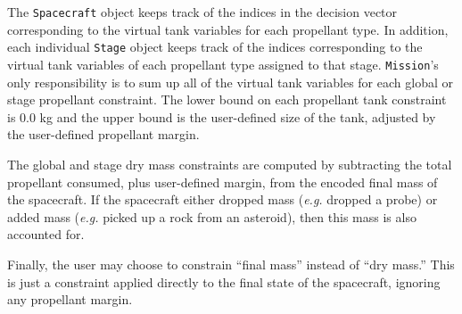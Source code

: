 The \texttt{Spacecraft} object keeps track of the indices in the decision vector corresponding to the virtual tank variables for each propellant type. In addition, each individual \texttt{Stage} object keeps track of the indices corresponding to the virtual tank variables of each propellant type assigned to that stage. \texttt{Mission}'s only responsibility is to sum up all of the virtual tank variables for each global or stage propellant constraint. The lower bound on each propellant tank constraint is 0.0 kg and the upper bound is the user-defined size of the tank, adjusted by the user-defined propellant margin.

The global and stage dry mass constraints are computed by subtracting the total propellant consumed, plus user-defined margin, from the encoded final mass of the spacecraft. If the spacecraft either dropped mass (\textit{e.g.} dropped a probe) or added mass (\textit{e.g.} picked up a rock from an asteroid), then this mass is also accounted for.

Finally, the user may choose to constrain ``final mass'' instead of ``dry mass.'' This is just a constraint applied directly to the final state of the spacecraft, ignoring any propellant margin.
